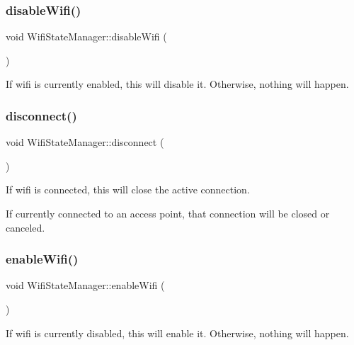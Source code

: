 \subsubsection{\texorpdfstring{disable\+Wifi()}{disableWifi()}}
{\footnotesize\ttfamily void Wifi\+State\+Manager\+::disable\+Wifi (\begin{DoxyParamCaption}{ }\end{DoxyParamCaption})}

If wifi is currently enabled, this will disable it. Otherwise, nothing will happen. \mbox{\label{classWifiStateManager_aa9f478f7905b7103bf6596dcbe6717d3}} 
\subsubsection{\texorpdfstring{disconnect()}{disconnect()}}
{\footnotesize\ttfamily void Wifi\+State\+Manager\+::disconnect (\begin{DoxyParamCaption}{ }\end{DoxyParamCaption})}

If wifi is connected, this will close the active connection.

If currently connected to an access point, that connection will be closed or canceled. \mbox{\label{classWifiStateManager_a2528684b37998029537a4f6ff5d47d6f}} 
\subsubsection{\texorpdfstring{enable\+Wifi()}{enableWifi()}}
{\footnotesize\ttfamily void Wifi\+State\+Manager\+::enable\+Wifi (\begin{DoxyParamCaption}{ }\end{DoxyParamCaption})}

If wifi is currently disabled, this will enable it. Otherwise, nothing will happen. \mbox{\label{classWifiStateManager_aaaef8257edc65b1a44e5ab81640d7cd1}} 
